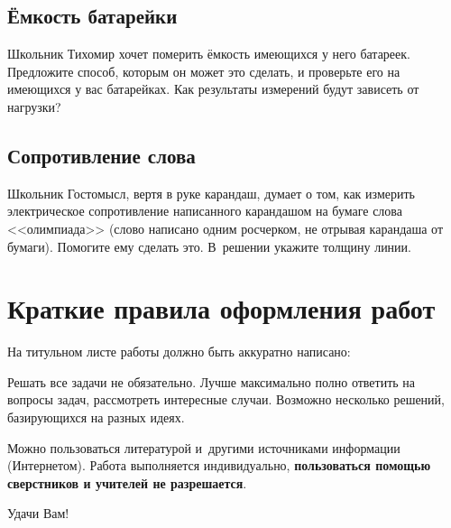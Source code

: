 \documentclass[a4paper,12pt]{article}
\begin{document}
\subsection{Ёмкость батарейки}
Школьник Тихомир хочет померить ёмкость имеющихся у него батареек. Предложите способ,
которым он может это сделать, и проверьте его на имеющихся у вас батарейках.
Как результаты измерений будут зависеть от нагрузки?

\subsection{Сопротивление слова}
Школьник Гостомысл, вертя в руке карандаш, думает о том, как измерить электрическое
сопротивление написанного карандашом на бумаге слова <<олимпиада>> (слово написано
одним росчерком, не отрывая карандаша от бумаги). Помогите ему сделать это.
В~решении укажите толщину линии.

\newpage

\section*{Краткие правила оформления работ}

\footnotesize

На титульном листе работы должно быть аккуратно написано:

Решать все задачи не обязательно. Лучше максимально полно ответить на вопросы задач,
рассмотреть интересные случаи. Возможно несколько решений, базирующихся
на разных идеях.

Можно пользоваться литературой и~другими источниками информации (Интернетом).
Работа выполняется индивидуально, \textbf{пользоваться помощью сверстников и учителей не разрешается}.



\bigskip
\normalsize

Удачи Вам!
\end{document}
